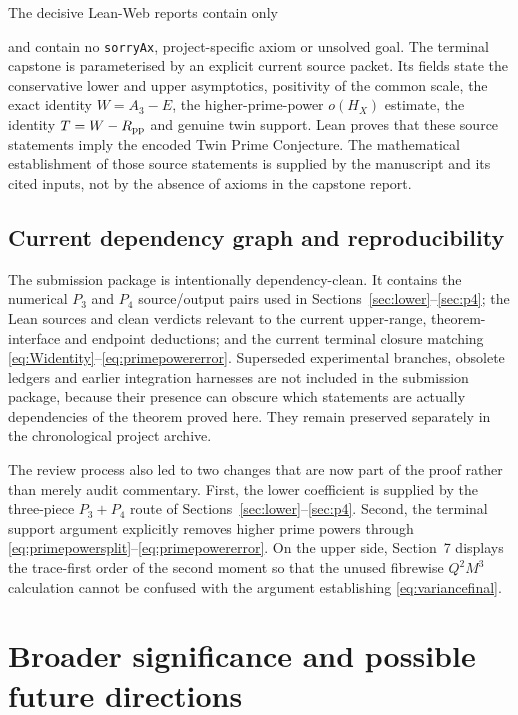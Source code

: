 \documentclass{aomart}
\theoremstyle{definition}
\newcommand{\1}{\mathbf 1}
\begin{document}
The decisive Lean-Web reports contain only
\begin{quote}
\footnotesize{}
\end{quote}
and contain no \texttt{sorryAx}, project-specific axiom or unsolved goal.  The terminal capstone is parameterised by an explicit current source packet.  Its fields state the conservative lower and upper asymptotics, positivity of the common scale, the exact identity $W=A_3-E$, the higher-prime-power $o(H_X)$ estimate, the identity $T=W-R_{\rm pp}$ and genuine twin support.  Lean proves that these source statements imply the encoded Twin Prime Conjecture.  The mathematical establishment of those source statements is supplied by the manuscript and its cited inputs, not by the absence of axioms in the capstone report.

\subsection{Current dependency graph and reproducibility}
The submission package is intentionally dependency-clean.  It contains the numerical $P_3$ and $P_4$ source/output pairs used in Sections~\ref{sec:lower}--\ref{sec:p4}; the Lean sources and clean verdicts relevant to the current upper-range, theorem-interface and endpoint deductions; and the current terminal closure matching \eqref{eq:Widentity}--\eqref{eq:primepowererror}.  Superseded experimental branches, obsolete ledgers and earlier integration harnesses are not included in the submission package, because their presence can obscure which statements are actually dependencies of the theorem proved here.  They remain preserved separately in the chronological project archive.

The review process also led to two changes that are now part of the proof rather than merely audit commentary.  First, the lower coefficient is supplied by the three-piece $P_3+P_4$ route of Sections~\ref{sec:lower}--\ref{sec:p4}.  Second, the terminal support argument explicitly removes higher prime powers through \eqref{eq:primepowersplit}--\eqref{eq:primepowererror}.  On the upper side, Section~7 displays the trace-first order of the second moment so that the unused fibrewise $Q^2M^3$ calculation cannot be confused with the argument establishing \eqref{eq:variancefinal}.

\section{Broader significance and possible future directions}\label{sec:future}
\end{document}

